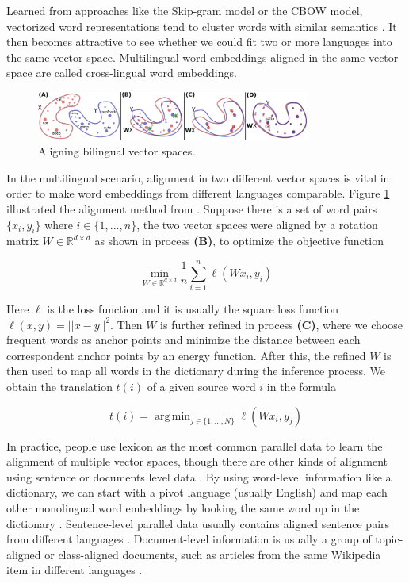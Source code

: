 \documentclass[thesis,fonts=libertine]{cluu}
\DeclareMathOperator*{\argmin}{arg\,min}
\begin{document}
Learned from approaches like the Skip-gram model or the CBOW model, vectorized word representations tend to cluster words with similar semantics \parencite{Mikolov:2013ac}. It then becomes attractive to see whether we could fit two or more languages into the same vector space. Multilingual word embeddings aligned in the same vector space are called cross-lingual word embeddings.

\begin{figure}
  \centering
  \includegraphics[width=0.8\textwidth]{vector_spaces_alignment.png}
  \caption{Aligning bilingual vector spaces. \parencite{Conneau:2017aa}}
  \label{fig:vec_space_align}
\end{figure}

In the multilingual scenario, alignment in two different vector spaces is vital in order to make word embeddings from different languages comparable. Figure \ref{fig:vec_space_align} illustrated the alignment method from \textcite{Conneau:2017aa}. Suppose there is a set of word pairs $\{x_i, y_i\}$ where ${i\in \{1, ..., n\}}$, the two vector spaces were aligned by a rotation matrix $W \in \mathbb{R}^{d \times d}$ as shown in process \textbf{(B)}, to optimize the objective function 

\begin{equation*}
  \min_{W \in \mathbb{R}^{d \times d}} \frac{1}{n}\sum_{i=1}^n \ell(Wx_i, y_i)
\end{equation*}

\noindent Here $\ell$ is the loss function and it is usually the square loss function $\ell(x, y)=||x-y||^2$. Then $W$ is further refined in process \textbf{(C)}, where we choose frequent words as anchor points and minimize the distance between each correspondent anchor points by an energy function. After this, the refined $W$ is then used to map all words in the dictionary during the inference process. We obtain the translation $t(i)$ of a given source word $i$ in the formula

\begin{equation*}
  t(i) = \argmin_{j\in \{1, ..., N\}} \ell(Wx_i, y_j)
\end{equation*}

In practice, people use lexicon as the most common parallel data to learn the alignment of multiple vector spaces, though there are other kinds of alignment using sentence or documents level data \parencite{Ruder:2019aa}. By using word-level information like a dictionary, we can start with a pivot language (usually English) and map each other monolingual word embeddings by looking the same word up in the dictionary \parencite{Mikolov:2013ac}. Sentence-level parallel data usually contains aligned sentence pairs from different languages \parencite{Hermann:2013aa}. Document-level information is usually a group of topic-aligned or class-aligned documents, such as articles from the same Wikipedia item in different languages \parencite{vulic-moens-2013-study}.
\end{document}
